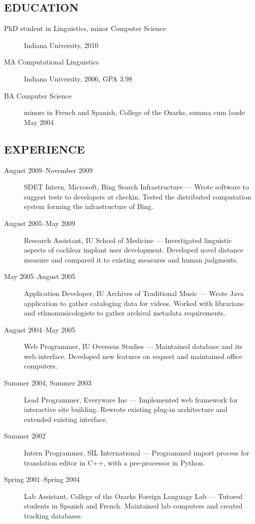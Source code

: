 \documentclass{iuthesis}
\begin{document}
\subsection*{EDUCATION}
\begin{description}
\item [PhD student in Linguistics, minor Computer Science] Indiana
  University, 2010
\item [MA Computational Linguistics] Indiana University, 2006, GPA 3.98
\item[BA Computer Science] minors in French and Spanish,
		College of the Ozarks, summa cum laude May 2004
\end{description}
\subsection*{EXPERIENCE}
\begin{description}
\item[August 2009--November 2009]
  SDET Intern, Microsoft, Bing Search Infrastructure --- Wrote
  software to suggest tests to developers at checkin. Tested
  the distributed computation system forming the infrastructure of
  Bing.
\item[August 2005--May 2009]
  Research Assistant, IU School of Medicine --- Investigated linguistic
  aspects of cochlear implant user development. Developed novel distance
  measure and compared it to existing measures and human judgments.
\item[May 2005--August 2005]
  Application Developer, IU Archives of Traditional Music --- Wrote Java
  application to gather cataloging data for videos. Worked with librarians and
  ethnomusicologists to gather archival metadata requirements.
\item[August 2004--May 2005]
  Web Programmer, IU Overseas Studies --- Maintained database and its
  web interface. Developed new features on request and maintained
  office computers.
\item[Summer 2004, Summer 2003]
  Lead Programmer, Everyware Inc --- Implemented web framework
  for interactive site building. Rewrote existing plug-in
  architecture and extended existing interface.
\item[Summer 2002]
  Intern Programmer, SIL International --- Programmed import
  process for translation editor in C++, with a pre-processor in Python.
\item[Spring 2001--Spring 2004]
  Lab Assistant, College of the Ozarks Foreign Language Lab ---
  Tutored students in Spanish and French. Maintained lab
  computers and created tracking databases.
\end{description}
\end{document}
